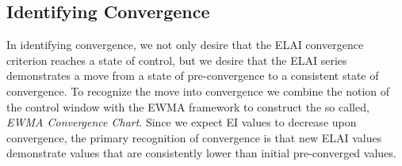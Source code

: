 \documentclass[12pt]{article}
\begin{document}
%
%

%
%
\subsection{Identifying Convergence}
%
%

%
In identifying convergence, we not only desire that the ELAI convergence criterion reaches a state of control, but we desire that the ELAI series demonstrates a move from a state of pre-convergence to a consistent state of convergence.
%
To recognize the move into convergence we combine the notion of the control window with the EWMA framework to construct the so called, {\it EWMA Convergence Chart}.
%
Since we expect EI values to decrease upon convergence, the primary recognition of convergence is that new ELAI values demonstrate values that are consistently lower than initial pre-converged values.
%

%
%
\end{document}
